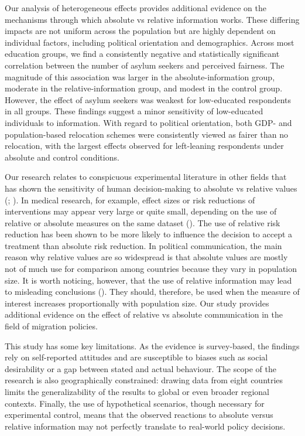 \documentclass[
  12pt,
  a4paper,
]{article}
\begin{document}
Our analysis of heterogeneous effects provides additional evidence on the mechanisms through which absolute vs relative information works. These differing impacts are not uniform across the population but are highly dependent on individual factors, including political orientation and demographics. Across most education groups, we find a consistently negative and statistically significant correlation between the number of asylum seekers and perceived fairness. The magnitude of this association was larger in the absolute-information group, moderate in the relative-information group, and modest in the control group. However, the effect of asylum seekers was weakest for low-educated respondents in all groups. These findings suggest a minor sensitivity of low-educated individuals to information. With regard to political orientation, both GDP- and population-based relocation schemes were consistently viewed as fairer than no relocation, with the largest effects observed for left-leaning respondents under absolute and control conditions.

Our research relates to conspicuous experimental literature in other fields that has shown the sensitivity of human decision-making to absolute vs relative values (; ). In medical research, for example, effect sizes or risk reductions of interventions may appear very large or quite small, depending on the use of relative or absolute measures on the same dataset (). The use of relative risk reduction has been shown to be more likely to influence the decision to accept a treatment than absolute risk reduction. In political communication, the main reason why relative values are so widespread is that absolute values are mostly not of much use for comparison among countries because they vary in population size. It is worth noticing, however, that the use of relative information may lead to misleading conclusions (). They should, therefore, be used when the measure of interest increases proportionally with population size. Our study provides additional evidence on the effect of relative vs absolute communication in the field of migration policies.

This study has some key limitations. As the evidence is survey-based, the findings rely on self-reported attitudes and are susceptible to biases such as social desirability or a gap between stated and actual behaviour. The scope of the research is also geographically constrained: drawing data from eight countries limits the generalizability of the results to global or even broader regional contexts. Finally, the use of hypothetical scenarios, though necessary for experimental control, means that the observed reactions to absolute versus relative information may not perfectly translate to real-world policy decisions.
\end{document}
